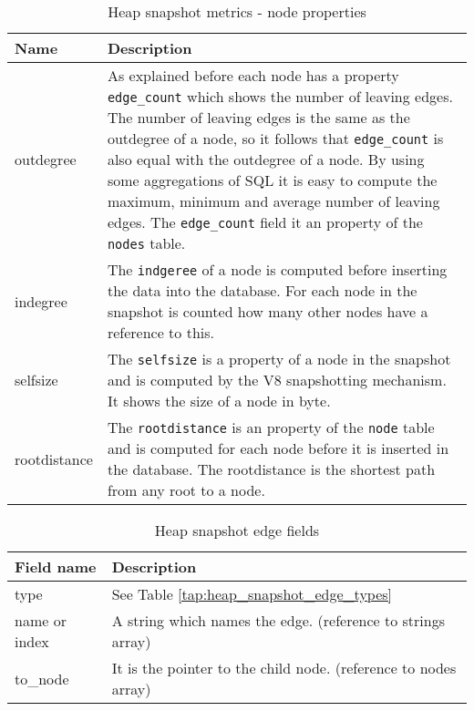 \begin{table}[!htbp]
	\small
	\centering
	\begin{tabular}{|p{1.5cm}||p{5.5cm}|}
		\hline
		\textbf{Name}	&	\textbf{Description} \\ \hline \hline					
		outdegree		& As explained before each node has a 
						  property \texttt{edge\_count} which 		
						  shows the number of leaving edges. 
						  The number of leaving edges is the same 	
						  as the outdegree of a node, so it follows 
						  that \texttt{edge\_count} is also 		
						  equal with the outdegree of a node. By 
						  using some aggregations of SQL it is 		
						  easy to compute the maximum, minimum and 
						  average number of leaving edges. 			
						  The \texttt{edge\_count} field it an 
						  property of the \texttt{nodes} table.		\\ \hline
		indegree		& The \texttt{indgeree} of a node is 
						  computed before inserting the data into	
						  the database. For each node in the 
						  snapshot is counted how many other nodes
						  have a reference to this.					\\ \hline
		selfsize		& The \texttt{selfsize} is a property of a 
						  node in the snapshot and is 				
						  computed by the V8 snapshotting mechanism. 
						   It shows the size of a node in			
						  byte.										\\ \hline 
		rootdistance	& The \texttt{rootdistance} is an property 
						  of the \texttt{node} table and is 		
						  computed for each node before it is 
						  inserted in the database. 				
						  The rootdistance is the shortest path from 
						   any root to a node.						\\ \hline
	\end{tabular}
	\caption{Heap snapshot metrics - node properties}
	\label{tap:heap_snapshot_metrics_node}
\end{table} 

\begin{table}[!htbp]
	\small
	\centering
	\begin{tabular}{|p{1.5cm}||p{5.5cm}|}
		\hline
		\textbf{Field name}	&	\textbf{Description}			\\ \hline \hline
		type & See Table \ref{tap:heap_snapshot_edge_types}		\\ \hline
		name or index & A string which names the edge. 
							(reference to strings array)		\\	\hline
		to\_node		& It is the pointer to the child node. 
							(reference to nodes array)			\\	\hline 
	\end{tabular}
	\caption{Heap snapshot edge fields}
	\label{tap:heap_snapshot_edge_fields}
\end{table}

